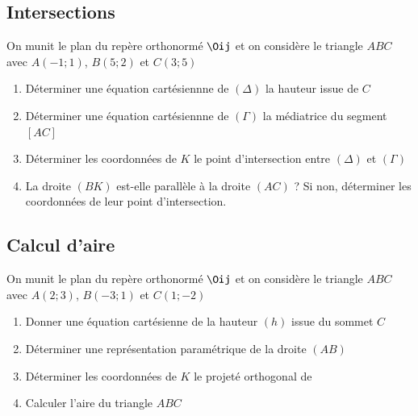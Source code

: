 \documentclass[oneside,12pt]{article}          %
\begin{document}
\subsection{Intersections}
On munit le plan du repère orthonormé $\Oij$ et on considère le triangle $ABC$ avec $A(-1;1)$, $B(5;2)$ et $C(3;5)$
\begin{enumerate}
    \item Déterminer une équation cartésiennne de $(\Delta)$ la hauteur issue de $C$
    \item Déterminer une équation cartésiennne de $(\Gamma)$ la médiatrice du segment $[AC]$
    \item Déterminer les coordonnées de $K$ le point d'intersection entre $(\Delta)$ et $(\Gamma)$
    \item La droite $(BK)$ est-elle parallèle à la droite $(AC)$ ? Si non, déterminer les coordonnées de leur point d'intersection.
\end{enumerate}



\subsection{Calcul d'aire}
On munit le plan du repère orthonormé $\Oij$ et on considère le triangle $ABC$ avec $A(2;3)$, $B(-3;1)$ et $C(1;-2)$
\begin{enumerate}
    \item Donner une équation cartésienne de la hauteur $(h)$ issue du sommet $C$
    \item Déterminer une représentation paramétrique de la droite $(AB)$
    \item Déterminer les coordonnées de $K$ le projeté orthogonal de 
    \item Calculer l'aire du triangle $ABC$
\end{enumerate}
\end{document}

